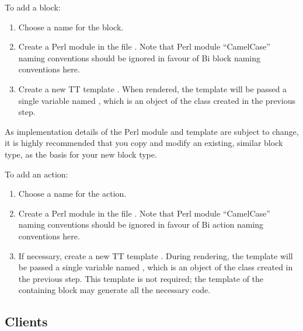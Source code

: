 To add a block:
\begin{enumerate}
\item Choose a name for the block.
\item Create a Perl module  in the
  file . Note that Perl module
  ``CamelCase'' naming conventions should be ignored in favour of Bi block
  naming conventions here.
\item Create a new TT template
  . When rendered, the template
  will be passed a single variable named , which is an object of
  the class created in the previous step.
\end{enumerate}

As implementation details of the Perl module and template are subject to
change, it is highly recommended that you copy and modify an existing, similar
block type, as the basis for your new block type.

To add an action:
\begin{enumerate}
\item Choose a name for the action.
\item Create a Perl module  in the
  file . Note that Perl module
  ``CamelCase'' naming conventions should be ignored in favour of Bi action
  naming conventions here.
\item If necessary, create a new TT template
  . During rendering, the
  template will be passed a single variable named , which is an
  object of the class created in the previous step. This template is not
  required; the template of the containing block may generate all the
  necessary code.
\end{enumerate}

\subsection{Clients}

